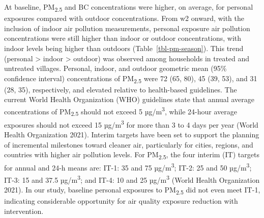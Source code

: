 \documentclass[
  letterpaper,
  DIV=11,
  numbers=noendperiod]{scrartcl}
\begin{document}
At baseline, PM\textsubscript{2.5} and BC concentrations were higher, on
average, for personal exposures compared with outdoor concentrations.
From w2 onward, with the inclusion of indoor air pollution measurements,
personal exposure air pollution concentrations were still higher than
indoor or outdoor concentrations, with indoor levels being higher than
outdoors (Table~\ref{tbl-pm-season}). This trend (personal
\textgreater{} indoor \textgreater{} outdoor) was observed among
households in treated and untreated villages. Personal, indoor, and
outdoor geometric mean (95\% confidence interval) concentrations of
PM\textsubscript{2.5} were 72 (65, 80), 45 (39, 53), and 31 (28, 35),
respectively, and elevated relative to health-based guidelines. The
current World Health Organization (WHO) guidelines state that annual
average concentrations of PM\textsubscript{2.5} should not exceed 5
µg/m\textsuperscript{3}, while 24-hour average exposures should not
exceed 15 µg/m\textsuperscript{3} for more than 3 to 4 days per year
(World Health Organization 2021). Interim targets have been set to
support the planning of incremental milestones toward cleaner air,
particularly for cities, regions, and countries with higher air
pollution levels. For PM\textsubscript{2.5}, the four interim (IT)
targets for annual and 24-h means are: IT-1: 35 and 75
µg/m\textsuperscript{3}; IT-2: 25 and 50 µg/m\textsuperscript{3}; IT-3:
15 and 37.5 µg/m\textsuperscript{3}; and IT-4: 10 and 25
µg/m\textsuperscript{3} (World Health Organization 2021). In our study,
baseline personal exposures to PM\textsubscript{2.5} did not even meet
IT-1, indicating considerable opportunity for air quality exposure
reduction with intervention.
\end{document}
